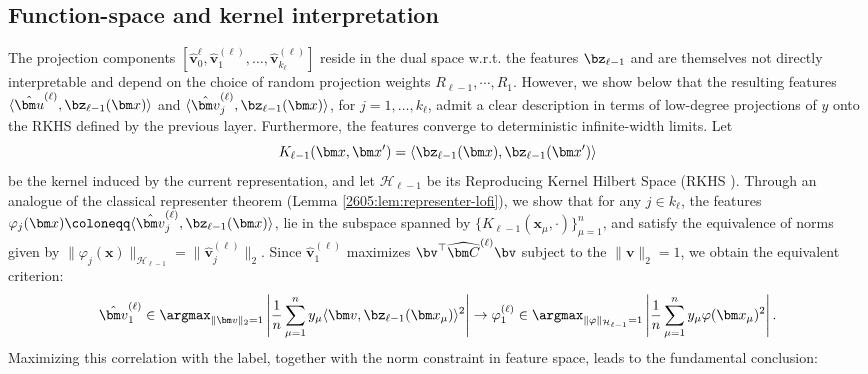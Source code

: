 \subsection{Function-space and kernel interpretation}
The projection components $[\hat{\bm v}^\ell_0 , \hat{\bm v}^{(\ell)}_1,\dots,\hat{\bm v}^{(\ell)}_{k_\ell}]$ reside in the dual space w.r.t. the features $\bz_{\ell-1}$ and are themselves not directly interpretable and depend on the choice of random projection weights $R_{\ell-1},\cdots, R_1$. However, we show below that the resulting features $\langle\hat{\bm u}^{(\ell)},\bz_{\ell-1}(\bm x)\rangle$ and $\langle \hat{\bm v}^{(\ell)}_j,\bz_{\ell-1}(\bm x)\rangle$, for $j=1,\dots,k_\ell$, admit a clear description in terms of low-degree projections of $y$ onto the RKHS defined by the previous layer. Furthermore, the features converge to deterministic infinite-width limits. Let
\begin{equation}
    K_{\ell-1}(\bm x,\bm x')
    =
    \langle
    \bz_{\ell-1}(\bm x),
    \bz_{\ell-1}(\bm x')
    \rangle
    \label{2605:eq:lofi-current-kernel}
\end{equation}
be the kernel induced by the current representation, and let \(\mathcal H_{\ell-1}\) be its Reproducing Kernel Hilbert Space (RKHS \cite{steinwart2008support,scholkopf2002learning}). Through an analogue of the classical representer theorem (Lemma \ref{2605:lem:representer-lofi}), we show that for any $j \in k_{\ell}$, the features
$
    \varphi_{j}(\bm x)
    \coloneqq
    \langle \hat{\bm v}^{(\ell)}_j, \bz_{\ell-1}(\bm x)\rangle$, lie in the subspace spanned by $\{K_{\ell-1}(\bm x_{\mu},\cdot)\}_{\mu=1}^n$, and satisfy the equivalence of norms given by \(\|\varphi_{j}(\bm x)\|_{\mathcal H_{\ell-1}}=\|\hat{\bm v}^{(\ell)}_j\|_2\). 
Since $\hat{\bm v}^{(\ell)}_1$ maximizes $\bv^\top\widehat{\bm C}^{(\ell)}\bv$ subject to the $\|\bm v\|_2=1$, we obtain the equivalent criterion:
\begin{equation}
\hat{\bm v}^{(\ell)}_1
    \in
    \argmax_{\|\bm v\|_2=1}
    \left|
    \frac1n
    \sum_{\mu=1}^n
    y_\mu
    \langle \bm v,\bz_{\ell-1}(\bm x_\mu)\rangle^2
    \right|
\rightarrow
    \varphi_1^{(\ell)}
    \in
    \argmax_{\|\varphi\|_{\mathcal H_{\ell-1}}=1}
    \left|
    \frac1n
    \sum_{\mu=1}^n
    y_\mu \varphi(\bm x_\mu)^2
    \right|.
    \label{2605:eq:lofi-rkhs-variational}
\end{equation}
Maximizing this correlation with the label, together with the norm constraint in feature space, leads to the fundamental conclusion:

